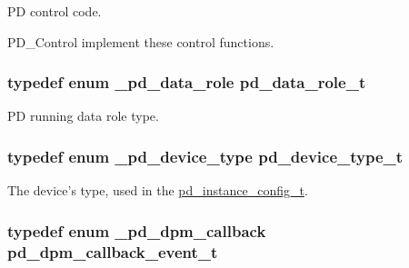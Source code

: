 P\-D control code. 

P\-D\-\_\-\-Control implement these control functions. \hypertarget{group__usb__pd__stack_gabe6e64840f66187fd82dca3d81259839}{
\subsubsection[{pd\-\_\-data\-\_\-role\-\_\-t}]{\setlength{\rightskip}{0pt plus 5cm}typedef enum {\bf \-\_\-pd\-\_\-data\-\_\-role}  {\bf pd\-\_\-data\-\_\-role\-\_\-t}}}\label{group__usb__pd__stack_gabe6e64840f66187fd82dca3d81259839}


P\-D running data role type. 

\hypertarget{group__usb__pd__stack_gac70b6cd09eeb45ce1aeaa279f44adbc7}{
\subsubsection[{pd\-\_\-device\-\_\-type\-\_\-t}]{\setlength{\rightskip}{0pt plus 5cm}typedef enum {\bf \-\_\-pd\-\_\-device\-\_\-type}  {\bf pd\-\_\-device\-\_\-type\-\_\-t}}}\label{group__usb__pd__stack_gac70b6cd09eeb45ce1aeaa279f44adbc7}


The device's type, used in the \hyperlink{group__usb__pd__stack_gafa6034f9e204836697da1f2fc996cbad}{pd\-\_\-instance\-\_\-config\-\_\-t}. 

\hypertarget{group__usb__pd__stack_ga75d3b9ae5fd2d84e59b0754f9855cb61}{
\subsubsection[{pd\-\_\-dpm\-\_\-callback\-\_\-event\-\_\-t}]{\setlength{\rightskip}{0pt plus 5cm}typedef enum {\bf \-\_\-pd\-\_\-dpm\-\_\-callback}  {\bf pd\-\_\-dpm\-\_\-callback\-\_\-event\-\_\-t}}}\label{group__usb__pd__stack_ga75d3b9ae5fd2d84e59b0754f9855cb61}


